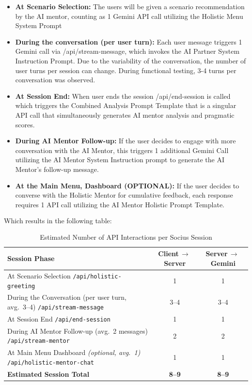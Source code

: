 \begin{itemize}
  \item \textbf{At Scenario Selection:} The users will be given a scenario recommendation by the AI mentor, counting as 1 Gemini API call utilizing the Holistic Menu System Prompt
  \item \textbf{During the conversation (per user turn):} Each user message triggers 1 Gemini call via /api/stream-message, which invokes the AI Partner System Instruction Prompt. Due to the variability of the conversation, the number of user turns per session can change. During functional testing, 3-4 turns per conversation was observed.
  \item \textbf{At Session End:} When user ends the session /api/end-session is called which triggers the Combined Analysis Prompt Template that is a singular API call that simultaneously generates AI mentor analysis and pragmatic scores. 
  \item \textbf{During AI Mentor Follow-up:} If the user decides to engage with more conversation with the AI Mentor, this triggers 1 additional Gemini Call utilizing the AI Mentor System Instruction prompt to generate the AI Mentor's follow-up message.
  \item \textbf{At the Main Menu, Dashboard (OPTIONAL):} If the user decides to converse with the Holistic Mentor for cumulative feedback, each response requires 1 API call utilizing the AI Mentor Holistic Prompt Template.
\end{itemize}

Which results in the following table:

\begin{table}[htbp]
\centering
\caption{Estimated Number of API Interactions per Socius Session}
\label{tab:gemini-calls}
\renewcommand{\arraystretch}{1.3}
\begin{tabular}{p{4.5cm} c c}
\toprule
\textbf{Session Phase} &
\textbf{Client$\,{\to}\,$Server} &
\textbf{Server$\,{\to}\,$Gemini} \\
\midrule
At Scenario Selection
\newline\texttt{/api/holistic-greeting}
& 1 & 1 \\[4pt]
During the Conversation (per user turn, avg.\ 3--4)
\newline\texttt{/api/stream-message}
& 3--4 & 3--4 \\[4pt]
At Session End
\newline\texttt{/api/end-session}
& 1 & 1 \\[4pt]
During AI Mentor Follow-up (avg.\ 2 messages)
\newline\texttt{/api/stream-mentor}
& 2 & 2 \\[4pt]
At Main Menu Dashboard \textit{(optional, avg.\ 1)}
\newline\texttt{/api/holistic-mentor-chat}
& 1 & 1 \\
\midrule
\textbf{Estimated Session Total} & \textbf{8--9} & \textbf{8--9} \\
\bottomrule
\end{tabular}
\smallskip

\end{table}


